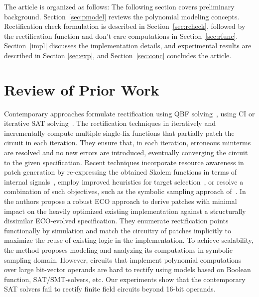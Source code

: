 The article is organized as follows: The following section covers preliminary
background. Section~\ref{sec:pmodel} reviews the polynomial modeling
concepts. Rectification check formulation is described in
Section~\ref{sec:rcheck}, followed by the rectification function and
don't care computations in Section~\ref{sec:rfunc}. Section~\ref{impl}
discusses the implementation details, and experimental
results are described in Section \ref{sec:exp}, and
Section~\ref{sec:conc} concludes the article. 

\section{Review of Prior Work}

Contemporary approaches formulate rectification
using QBF solving~\cite{scholl:2}, using CI or iterative SAT
solving~\cite{MF_Roland:ICCAD10,MF_Huang:DATE12}.  
The rectification techniques in 
\cite{fujita:2015,SS_Fujita:ISCAS19,MF_Huang:DATE12,SS_Roland:DAC18} 
iteratively and incrementally compute multiple single-fix functions
that partially patch the circuit in each iteration.
 They ensure that, in each iteration, erroneous minterms are resolved
and no new errors are introduced, eventually converging the circuit
to the given specification.
Recent techniques incorporate resource awareness in 
patch generation by re-expressing the obtained Skolem functions 
in terms of internal signals~\cite{SS_Alan:DAC18}, employ improved heuristics for
target selection~\cite{SS_Fujita:ISCAS19}, or resolve a combination of
such objectives, such as the symbolic sampling approach of~\cite{SS_Roland:DAC19}.
 In~\cite{SS_Roland:DAC19} the authors propose a robust ECO approach to derive 
patches with minimal impact on the heavily optimized existing implementation 
against a structurally dissimilar ECO-evolved specification. 
They enumerate rectification points functionally by simulation and match the circuitry of patches implicitly to maximize the reuse of existing logic in the implementation. To achieve 
scalability, the method proposes modeling and analyzing its computations 
in symbolic sampling domain. However, circuits that implement polynomial 
computations over large bit-vector operands are hard to rectify using 
models based on Boolean function, SAT/SMT-solvers, etc.
Our experiments show that the contemporary SAT solvers fail to rectify 
finite field circuits beyond 16-bit operands.


